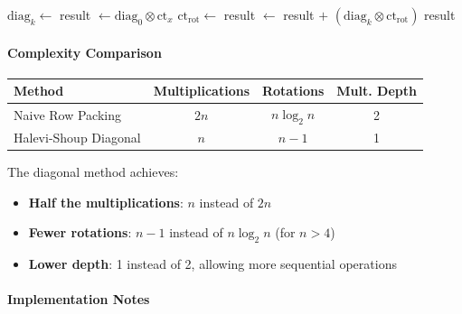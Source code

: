 \documentclass[11pt,a4paper]{article}
\newcommand{\bmod}{\text{ mod }}
\begin{document}
\begin{algorithm}[H]
\caption{Halevi-Shoup Matrix-Vector Multiplication}
\begin{algorithmic}[1]
    \State {}
        \State $\text{diag}_k \gets$ 
        \Comment{$\text{diag}_k[j] = A[j][(j+k) \bmod n]$}
    \EndFor
    \State
    \State {}
    \State result $\gets \text{diag}_0 \otimes \text{ct}_x$
        \State $\text{ct}_{\text{rot}} \gets$ 
        \State result $\gets$ result $+$ $(\text{diag}_k \otimes \text{ct}_{\text{rot}})$
    \EndFor
    \State \Return result
\EndFunction
\end{algorithmic}
\end{algorithm}

\paragraph{Complexity Comparison}

\begin{center}
\begin{tabular}{lccc}
\toprule
\textbf{Method} & \textbf{Multiplications} & \textbf{Rotations} & \textbf{Mult. Depth} \\
\midrule
Naive Row Packing & $2n$ & $n \log_2 n$ & 2 \\
Halevi-Shoup Diagonal & $n$ & $n-1$ & 1 \\
\bottomrule
\end{tabular}
\end{center}

The diagonal method achieves:
\begin{itemize}
    \item \textbf{Half the multiplications}: $n$ instead of $2n$
    \item \textbf{Fewer rotations}: $n-1$ instead of $n \log_2 n$ (for $n > 4$)
    \item \textbf{Lower depth}: 1 instead of 2, allowing more sequential operations
\end{itemize}

\paragraph{Implementation Notes}
\end{document}
